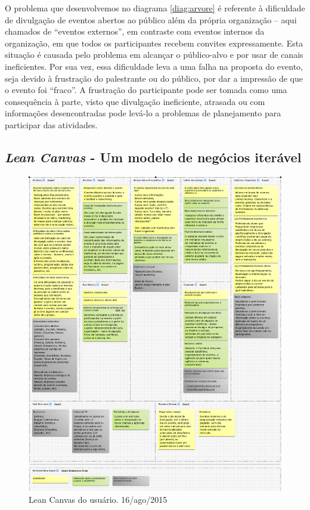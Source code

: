 \documentclass[12pt,a4paper,twoside,hyphens,english,brazil]{abntex2}
\begin{document}
O problema que desenvolvemos no diagrama \ref{diag:arvore} é referente à dificuldade de divulgação de eventos abertos ao público além da própria organização -- aqui chamados de ``eventos externos'', em contraste com eventos internos da organização, em que todos os participantes recebem convites expressamente. Esta situação é causada pelo problema em alcançar o público-alvo e por usar de canais ineficientes. Por sua vez, essa dificuldade leva a uma falha na proposta do evento, seja devido à frustração do palestrante ou do público, por dar a impressão de que o evento foi ``fraco''. A frustração do participante pode ser tomada como uma consequência à parte, visto que divulgação ineficiente, atrasada ou com informações desencontradas pode levá-lo a problemas de planejamento para participar das atividades.


\subsection{\emph{Lean Canvas} - Um modelo de negócios iterável}

\begin{figure}[!bp]
	\centering
	\includegraphics[width=1\linewidth]{imagens/canvas-usuarios.png}
	\caption{Lean Canvas do usuário. 16/ago/2015}
\end{figure}
\end{document}
